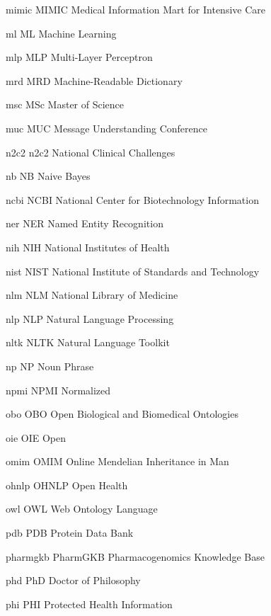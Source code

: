\newabbreviation
{mimic}
{MIMIC}
{Medical Information Mart for Intensive Care}

\newabbreviation
{ml}
{ML}
{Machine Learning}

\newabbreviation
{mlp}
{MLP}
{Multi-Layer Perceptron}

\newabbreviation
{mrd}
{MRD}
{Machine-Readable Dictionary}

\newabbreviation
{msc}
{MSc}
{Master of Science}

\newabbreviation
{muc}
{MUC}
{Message Understanding Conference}

\newabbreviation
{n2c2}
{n2c2}
{National  Clinical Challenges}

\newabbreviation
{nb}
{NB}
{Naive Bayes}

\newabbreviation
{ncbi}
{NCBI}
{National Center for Biotechnology Information}

\newabbreviation
{ner}
{NER}
{Named Entity Recognition}

\newabbreviation
{nih}
{NIH}
{National Institutes of Health}

\newabbreviation
{nist}
{NIST}
{National Institute of Standards and Technology}

\newabbreviation
{nlm}
{NLM}
{National Library of Medicine}

\newabbreviation
{nlp}
{NLP}
{Natural Language Processing}

\newabbreviation
{nltk}
{NLTK}
{Natural Language Toolkit}

\newabbreviation
{np}
{NP}
{Noun Phrase}

\newabbreviation
{npmi}
{NPMI}
{Normalized }

\newabbreviation
{obo}
{OBO}
{Open Biological and Biomedical Ontologies}

\newabbreviation
{oie}
{OIE}
{Open }

\newabbreviation
{omim}
{OMIM}
{Online Mendelian Inheritance in Man}

\newabbreviation
{ohnlp}
{OHNLP}
{Open Health }

\newabbreviation
{owl}
{OWL}
{Web Ontology Language}

\newabbreviation
{pdb}
{PDB}
{Protein Data Bank}

\newabbreviation
{pharmgkb}
{PharmGKB}
{Pharmacogenomics Knowledge Base}

\newabbreviation
{phd}
{PhD}
{Doctor of Philosophy}

\newabbreviation
{phi}
{PHI}
{Protected Health Information}

